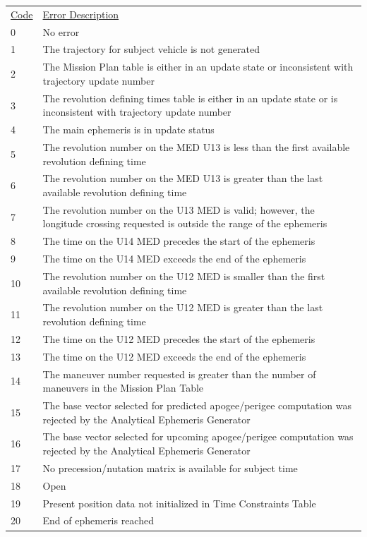 \documentclass[11pt]{article} %
\begin{document}
\begin{tabular}{p{1cm} p{12cm}}
\underline{Code}&\underline{Error Description}\\
0&No error\\
1&The trajectory for subject vehicle is not generated\\
2&The Mission Plan table is either in an update state or inconsistent with trajectory update number\\
3&The revolution defining times table is either in an update state or is inconsistent with trajectory update number\\
4&The main ephemeris is in update status\\
5&The revolution number on the MED U13 is less than the first available revolution defining time\\
6&The revolution number on the MED U13 is greater than the last available revolution defining time\\
7&The revolution number on the U13 MED is valid; however, the longitude crossing requested is outside the range of the ephemeris\\
8&The time on the U14 MED precedes the start of the ephemeris\\
9&The time on the U14 MED exceeds the end of the ephemeris\\
10&The revolution number on the U12 MED is smaller than the first available revolution defining time\\
11&The revolution number on the U12 MED is greater than the last revolution defining time\\
12&The time on the U12 MED precedes the start of the ephemeris\\
13&The time on the U12 MED exceeds the end of the ephemeris\\
14&The maneuver number requested is greater than the number of maneuvers in the Mission Plan Table\\
15&The base vector selected for predicted apogee/perigee computation was rejected by the Analytical Ephemeris Generator\\
16&The base vector selected for upcoming apogee/perigee computation was rejected by the Analytical Ephemeris Generator\\
17&No precession/nutation matrix is available for subject time\\
18&Open\\
19&Present position data not initialized in Time Constraints Table\\
20&End of ephemeris reached\\
\end{tabular}
\newpage
\end{document}

